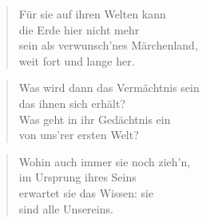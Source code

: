 \documentclass[10pt,a4paper]{article}
\begin{document}
\begin{paracol}{2}
\begin{verse}
Für sie auf ihren Welten kann \\
die Erde hier nicht mehr \\
sein als verwunsch’nes Märchenland, \\
weit fort und lange her. \\
\end{verse}

\begin{verse}
Was wird dann das Vermächtnis sein \\
das ihnen sich erhält? \\
Was geht in ihr Gedächtnis ein \\
von uns’rer ersten Welt? \\
\end{verse}

\begin{verse}
Wohin auch immer sie noch zieh’n, \\
im Ursprung ihres Seins \\
erwartet sie das Wissen: sie \\
sind alle Unsereins. \\
\end{verse}

\end{paracol}
\end{document}
